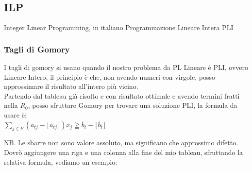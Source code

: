\documentclass{article}
\begin{document}
\begin{center}
\end{center}
\newpage
\subsection{ILP}
Integer Linear Programming, in italiano Programmazione Lineare Intera PLI
\subsubsection{Tagli di Gomory}
I tagli di gomory si usano quando il nostro problema da PL Lineare è PLI, ovvero Lineare Intero, il principio è che, non avendo numeri con virgole, posso approssimare il risultato all'intero più vicino.\\

Partendo dal tableau già risolto e con risultato ottimale e avendo termini fratti nella $R_0$, posso sfruttare Gomory per trovare una soluzione PLI, la formula da usare è:\\
$\displaystyle \sum_{j \in F} ( \overline{a}_{tj} - \lfloor \overline{a}_{tj} \rfloor )x_j \geqq \overline{b}_t -  \lfloor \overline{b}_t \rfloor$

NB. Le sbarre non sono valore assoluto, ma significano che approssimo difetto.\\
Dovrò aggiungere una riga e una colonna alla fine del mio tableau, sfruttando la relativa formula, vediamo un esempio:\\

\begin{center}
\end{center}
\end{document}
